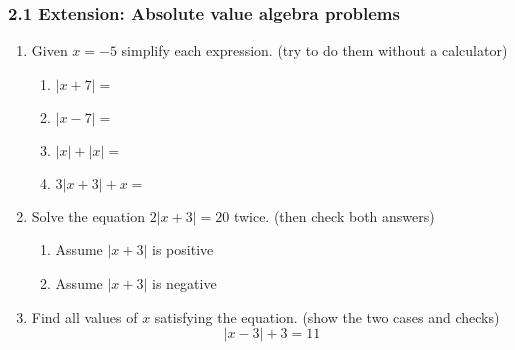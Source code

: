 

\fancyhead[LE]{\thepage}


\subsubsection*{2.1 Extension: Absolute value algebra problems}
\begin{enumerate}[itemsep=1.2cm]
\item Given $x=-5$ simplify each expression. (try to do them without a calculator)
  \begin{multicols}{2}
    \begin{enumerate}[itemsep=1.25cm]
      \item $|x+7|=$
      \item $|x-7|=$
      \item $|x|+|x|=$
      \item $3 |x+3|+x=$
    \end{enumerate}
  \end{multicols} \vspace{0.5cm}

\item Solve the equation $ 2|x+3| = 20$ twice. (then check both answers)
\begin{multicols}{2}
  \begin{enumerate}
    \item Assume $|x+3|$ is positive
    \item Assume $|x+3|$ is negative
  \end{enumerate}
\end{multicols} \vspace{4cm}

\item Find all values of $x$ satisfying the equation. (show the two cases and checks) 
$$ |x-3|+3 = 11$$

\end{enumerate}
